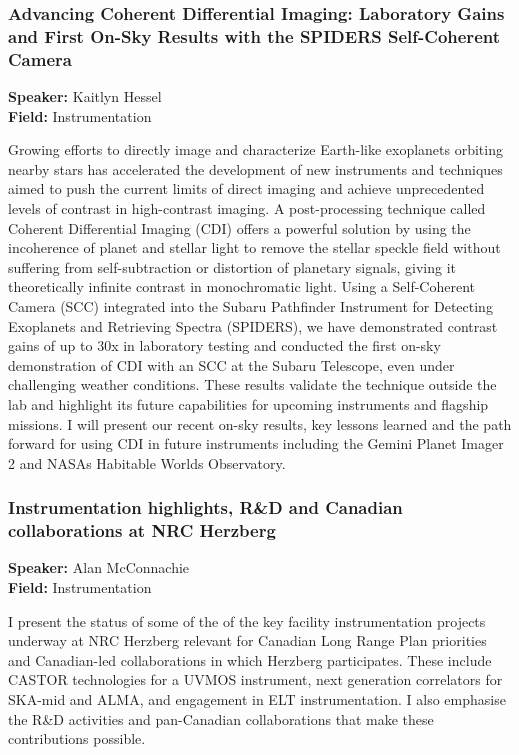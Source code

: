 \hypertarget{abstract-talk-194}{}\label{abstract-page-talk-194}
\subsubsection*{Advancing Coherent Differential Imaging: Laboratory Gains and First On-Sky Results with the SPIDERS Self-Coherent Camera}
\textbf{Speaker:} Kaitlyn Hessel\\
\textbf{Field:} Instrumentation

Growing efforts to directly image and characterize Earth-like exoplanets orbiting nearby stars has accelerated the development of new instruments and techniques aimed to push the current limits of direct imaging and achieve unprecedented levels of contrast in high-contrast imaging. A post-processing technique called Coherent Differential Imaging (CDI) offers a powerful solution by using the incoherence of planet and stellar light to remove the stellar speckle field without suffering from self-subtraction or distortion of planetary signals, giving it theoretically infinite contrast in monochromatic light. Using a Self-Coherent Camera (SCC) integrated into the Subaru Pathfinder Instrument for Detecting Exoplanets and Retrieving Spectra (SPIDERS), we have demonstrated contrast gains of up to 30x in laboratory testing and conducted the first on-sky demonstration of CDI with an SCC at the Subaru Telescope, even under challenging weather conditions. These results validate the technique outside the lab and highlight its future capabilities for upcoming instruments and flagship missions. I will present our recent on-sky results, key lessons learned and the path forward for using CDI in future instruments including the Gemini Planet Imager 2 and NASAs Habitable Worlds Observatory.

\hypertarget{abstract-talk-151}{}\label{abstract-page-talk-151}
\subsubsection*{Instrumentation highlights, R\&D and Canadian collaborations at NRC Herzberg}
\textbf{Speaker:} Alan McConnachie\\
\textbf{Field:} Instrumentation

I present the status of some of the of the key facility instrumentation projects underway at NRC Herzberg relevant for Canadian Long Range Plan priorities and Canadian-led collaborations in which Herzberg participates. These include CASTOR technologies for a UVMOS instrument, next generation correlators for SKA-mid and ALMA, and engagement in ELT instrumentation. I also emphasise the R\&D activities and pan-Canadian collaborations that make these contributions possible.

